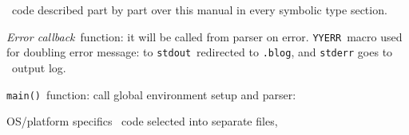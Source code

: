 \label{cppcore}\secdown

\cpp\ code described part by part over this manual in every
symbolic type section.


\emph{Error callback}\ function: it will be called from parser on error.
\verb|YYERR|\ macro used for doubling error message: to
\verb|stdout|\ redirected to \verb|.blog|, and \verb|stderr| goes to \make\
output log.


\verb|main()|\ function: call global environment setup and parser:



OS/platform specifics \cpp\ code selected into separate files,


\secup
